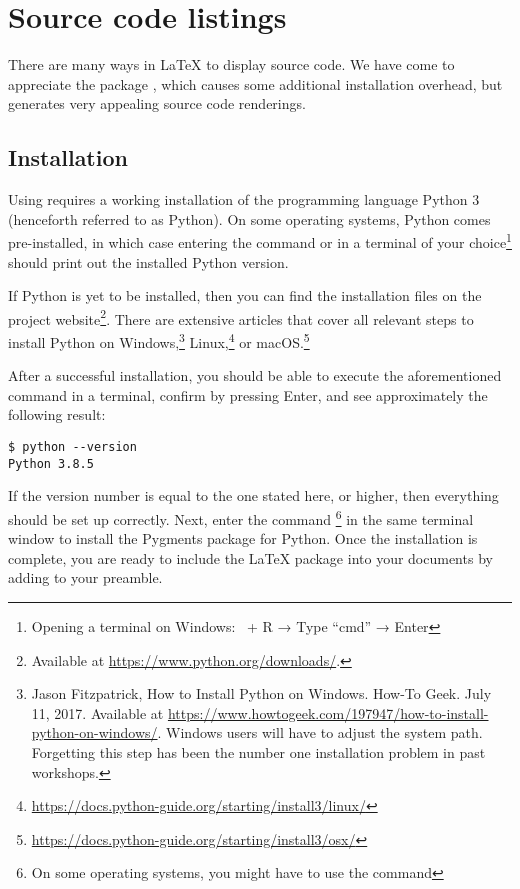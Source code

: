 \chapter{Source code listings}
\label{sec:source-code-listings}

There are many ways in \LaTeX{} to display source code.
We have come to appreciate the package , which causes some additional installation overhead, but generates very appealing source code renderings.

\section{Installation}
Using  requires a working installation of the programming language Python 3 (henceforth referred to as Python).
On some operating systems, Python comes pre-installed, in which case entering the command  or  in a terminal of your choice\footnote{Opening a terminal on Windows: \faWindows\ + R → Type \enquote{cmd} → Enter} should print out the installed Python version.

If Python is yet to be installed, then you can find the installation files on the project website\footnote{Available at \url{https://www.python.org/downloads/}.}.
There are extensive articles that cover all relevant steps to install Python on 
Windows,\footnote{Jason Fitzpatrick, How to Install Python on Windows. How-To 
Geek. July 11, 2017. Available at 
\url{https://www.howtogeek.com/197947/how-to-install-python-on-windows/}. 
Windows users will have to adjust the system path. Forgetting this step has 
been the number one installation problem in past workshops.} 
Linux,\footnote{\url{https://docs.python-guide.org/starting/install3/linux/}} 
or macOS.\footnote{\url{https://docs.python-guide.org/starting/install3/osx/}}

After a successful installation, you should be able to execute the aforementioned command in a terminal, confirm by pressing Enter, and see approximately the following result: 

\begin{verbatim}
$ python --version
Python 3.8.5
\end{verbatim}

\noindent If the version number is equal to the one stated here, or higher, then everything should be set up correctly.
Next, enter the command \footnote{On some operating systems, you might have to use the command } in the same terminal window to install the Pygments package for Python.
Once the installation is complete, you are ready to include the \LaTeX{} package  into your documents by adding  to your preamble.


